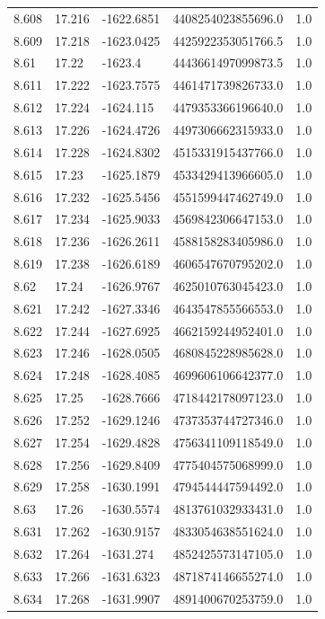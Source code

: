 \begin{tabular}{lllll}
8.608 & 17.216 & -1622.6851 & 4408254023855696.0 & 1.0 \\
8.609 & 17.218 & -1623.0425 & 4425922353051766.5 & 1.0 \\
8.61 & 17.22 & -1623.4 & 4443661497099873.5 & 1.0 \\
8.611 & 17.222 & -1623.7575 & 4461471739826733.0 & 1.0 \\
8.612 & 17.224 & -1624.115 & 4479353366196640.0 & 1.0 \\
8.613 & 17.226 & -1624.4726 & 4497306662315933.0 & 1.0 \\
8.614 & 17.228 & -1624.8302 & 4515331915437766.0 & 1.0 \\
8.615 & 17.23 & -1625.1879 & 4533429413966605.0 & 1.0 \\
8.616 & 17.232 & -1625.5456 & 4551599447462749.0 & 1.0 \\
8.617 & 17.234 & -1625.9033 & 4569842306647153.0 & 1.0 \\
8.618 & 17.236 & -1626.2611 & 4588158283405986.0 & 1.0 \\
8.619 & 17.238 & -1626.6189 & 4606547670795202.0 & 1.0 \\
8.62 & 17.24 & -1626.9767 & 4625010763045423.0 & 1.0 \\
8.621 & 17.242 & -1627.3346 & 4643547855566553.0 & 1.0 \\
8.622 & 17.244 & -1627.6925 & 4662159244952401.0 & 1.0 \\
8.623 & 17.246 & -1628.0505 & 4680845228985628.0 & 1.0 \\
8.624 & 17.248 & -1628.4085 & 4699606106642377.0 & 1.0 \\
8.625 & 17.25 & -1628.7666 & 4718442178097123.0 & 1.0 \\
8.626 & 17.252 & -1629.1246 & 4737353744727346.0 & 1.0 \\
8.627 & 17.254 & -1629.4828 & 4756341109118549.0 & 1.0 \\
8.628 & 17.256 & -1629.8409 & 4775404575068999.0 & 1.0 \\
8.629 & 17.258 & -1630.1991 & 4794544447594492.0 & 1.0 \\
8.63 & 17.26 & -1630.5574 & 4813761032933431.0 & 1.0 \\
8.631 & 17.262 & -1630.9157 & 4833054638551624.0 & 1.0 \\
8.632 & 17.264 & -1631.274 & 4852425573147105.0 & 1.0 \\
8.633 & 17.266 & -1631.6323 & 4871874146655274.0 & 1.0 \\
8.634 & 17.268 & -1631.9907 & 4891400670253759.0 & 1.0 \\

\end{tabular}
